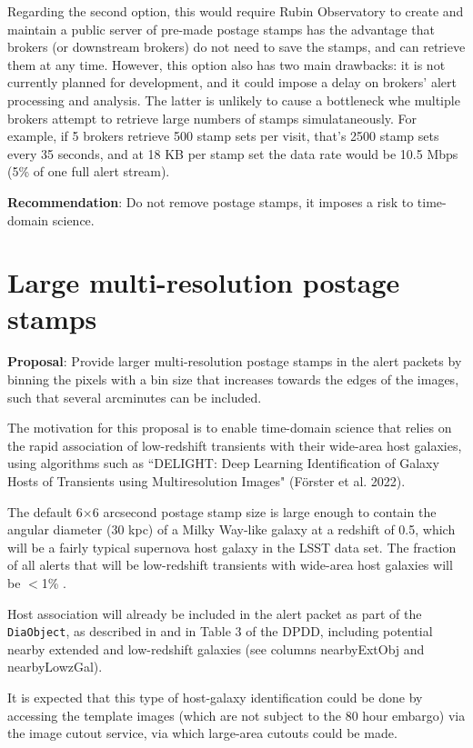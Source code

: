 \documentclass[DM,authoryear,toc]{lsstdoc}
\begin{document}
Regarding the second option, this would require Rubin Observatory to create and maintain a public server of 
pre-made postage stamps has the advantage that brokers (or downstream brokers) do not need to save the stamps, 
and can retrieve them at any time.
However, this option also has two main drawbacks: it is not currently planned for development, and it could impose 
a delay on brokers' alert processing and analysis.
The latter is unlikely to cause a bottleneck whe multiple brokers attempt to retrieve large numbers of stamps simulataneously.
For example, if 5 brokers retrieve 500 stamp sets per visit, that's 2500 stamp sets every 35 seconds, and at 18 KB 
per stamp set the data rate would be 10.5 Mbps (5\% of one full alert stream).

\textbf{Recommendation}: Do not remove postage stamps, it imposes a risk to time-domain science.


\section{Large multi-resolution postage stamps}\label{sec:bigstamps}

\textbf{Proposal}: Provide larger multi-resolution postage stamps in the alert packets by binning 
the pixels with a bin size that increases towards the edges of the images, such that several 
arcminutes can be included.

The motivation for this proposal is to enable time-domain science that relies on the rapid association 
of low-redshift transients with their wide-area host galaxies, using algorithms such as 
``DELIGHT: Deep Learning Identification of Galaxy Hosts of Transients using Multiresolution Images" (Förster et al. 2022).

The default 6$\times$6 arcsecond postage stamp size is large enough to contain the angular diameter (30 kpc) 
of a Milky Way-like galaxy at a redshift of 0.5, which will be a fairly typical supernova host galaxy in the LSST data set.
The fraction of all alerts that will be low-redshift transients with wide-area host galaxies will be $<$1\% .

Host association will already be included in the alert packet as part of the \texttt{DiaObject}, as described in  
and in Table 3 of the DPDD, including potential nearby extended and low-redshift galaxies (see columns nearbyExtObj and nearbyLowzGal).

It is expected that this type of host-galaxy identification could be done by accessing the template images 
(which are not subject to the 80 hour embargo) via the image cutout service, via which large-area cutouts could be made.
\end{document}
